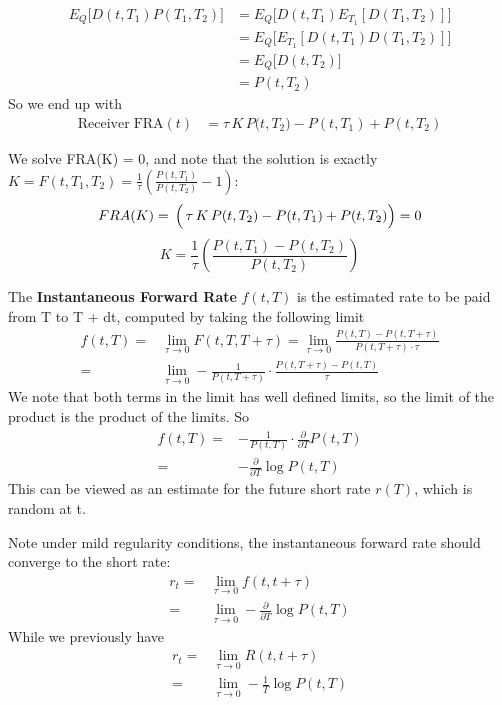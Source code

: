 \begin{definition}
    \begin{align*}
        E_Q \bigl[ D(t, T_1) P(T_1, T_2) \bigr]
        &= E_Q \bigl[ D(t, T_1) E_{T_1} [  D(T_1, T_2) ] \bigr]\\
        &= E_Q \bigl[ E_{T_1} [ D(t, T_1) D(T_1, T_2) ] \bigr]\\
        &= E_Q \bigl[ D(t, T_2) \bigr] \\
        &= P(t, T_2)
    \end{align*}
    So we end up with 
    \begin{align}
        \mathrm{Receiver\;FRA}(t) 
        &= \tau\,K\,P\bigl(t, T_2\bigr) - P(t, T_1) + P(t, T_2) \label{eq:fra}
    \end{align}
\end{definition}

We solve FRA(K) = 0, and note that the solution is exactly 
$K = F(t, T_1, T_2) 
= \frac{1}{\tau} \left( \frac{P(t, T_1)}{P(t, T_2)} - 1 \right)$:
\[
   FRA(K) =  \,\Bigl(\,\tau\,K\,P(t, T_2) - P(t, T_1) + P(t, T_2)\Bigr) = 0
\]
\[
   K = \frac{1}{\tau} \left( \frac{P(t, T_1) - P(t, T_2)}{P(t, T_2)} \right)
\]

\begin{definition}
    The \textbf{Instantaneous Forward Rate} $f(t, T)$ is the estimated rate to be paid from T to T + dt, 
    computed by taking the following limit \\
    \begin{align*}
        f(t, T) =& \lim_{\tau \to 0} F(t, T, T + \tau) = \lim_{\tau \to 0} \frac{P(t, T) - P(t, T + \tau)}{P(t, T + \tau) \cdot \tau} \\
        =& \lim_{\tau \to 0} -\frac{1}{P(t, T + \tau)} \cdot \frac{P(t, T + \tau) - P(t, T)}{\tau} 
    \end{align*}
    We note that both terms in the limit has well defined limits, 
    so the limit of the product is the product of the limits. So
    \begin{align*}
        f(t, T) 
        =& -\frac{1}{P(t, T)} \cdot \frac{\partial}{\partial T} P(t, T) \\
        =& -\frac{\partial}{\partial T} \log P(t, T)
    \end{align*}
    This can be viewed as an estimate for the future short rate $r(T)$, which is random at t.
\end{definition}
Note under mild regularity conditions, the instantaneous forward rate should converge to the short rate:
\begin{align*}
    r_t =& \lim_{\tau \to 0} f(t, t + \tau) \\
    =& \lim_{\tau \to 0} -\frac{\partial}{\partial T} \log P(t, T)
\end{align*}
While we previously have
\begin{align*}
    r_t =& \lim_{\tau \to 0} R(t, t + \tau) \\
    =& \lim_{\tau \to 0} -\frac{1}{T} \log P(t, T) 
\end{align*}

